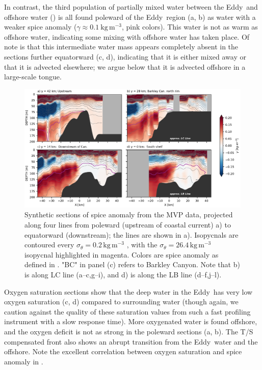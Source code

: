 \documentclass[draft]{agujournal2019}
\newcommand*{\Eddy}{{\sc Eddy}}
\begin{document}
In contrast, the third population of partially mixed water between the \Eddy\ and offshore water () is all found poleward of the \Eddy\ region (a, b) as water with a weaker spice anomaly ($\gamma \approx 0.1\ \mathrm{kg\,m^{-3}}$, pink colors).  This water is not as warm as offshore water, indicating some mixing with offshore water has taken place.  Of note is that this intermediate water mass appears completely absent in the sections further equatorward (c, d), indicating that it is either mixed away or that it is advected elsewhere; we argue below that it is advected offshore in a large-scale tongue.


\begin{figure}[htbp]
  \begin{center}
    \includegraphics[width=6.2in]{CrossSectionsSpice}
    \caption{Synthetic sections of spice anomaly from the MVP data, projected along four lines from poleward (upstream of coastal current) a) to equatorward (downstream); the lines are shown in a).    Isopycnals are contoured every $\sigma_{\theta} = 0.2\,\mathrm{kg\,m^{-3}}$ , with the $\sigma_{\theta} = 26.4\,\mathrm{kg\,m^{-3}}$ isopycnal highlighted in magenta.  Colors are spice anomaly as defined in . "BC" in panel (c) refers to Barkley Canyon. Note that b) is along LC line (a--c,g--i), and d) is along the LB line (d--f,j--l).
      \label{fig:CrossSectionsSpice} }
  \end{center}
\end{figure}

Oxygen saturation sections show that the deep water in the  \Eddy\ has very low oxygen saturation (c, d) compared to surrounding water (though again, we caution against the quality of these saturation values from such a fast profiling instrument with a slow response time).  More oxygenated water is found offshore, and the oxygen deficit is not as strong in the poleward sections (a, b).  The T/S compensated front also shows an abrupt transition from the \Eddy\ water and the offshore. Note the excellent correlation between oxygen saturation and spice anomaly in .
\end{document}
